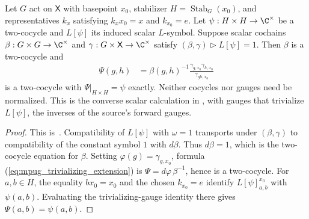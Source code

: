 \begin{lemma}
    \label{lem:mpug_trivializing_extension}
    \leanok
    Let $G$ act on $\mathsf X$ with basepoint $x_0$, stabilizer
    $H=\operatorname{Stab}_G(x_0)$, and representatives $k_x$ satisfying
    $k_xx_0=x$ and $k_{x_0}=e$. Let $\psi:H\times H\to\C^\times$ be a
    two-cocycle and $L[\psi]$ its induced scalar $L$-symbol.
    Suppose scalar cochains $\beta:G\times G\to\C^\times$ and
    $\gamma:G\times\mathsf X\to\C^\times$ satisfy
    $(\beta,\gamma)\mathbin{\triangleright}L[\psi]=1$.
    Then $\beta$ is a two-cocycle and
    \begin{align}
        \Psi(g,h)
         & =\beta(g,h)^{-1}
        \frac{\gamma_{g,x_0}\gamma_{h,x_0}}{\gamma_{gh,x_0}}
        \label{eq:mpug_trivializing_extension}
    \end{align}
    is a two-cocycle with $\Psi|_{H\times H}=\psi$ exactly.
    Neither cocycles nor gauges need be normalized.
    This is the converse scalar calculation in
    \cite[lines~7057--7064]{FrancoRubio2025MPUGauging}, with gauges that
    trivialize $L[\psi]$, the inverses of the source's forward gauges.
\end{lemma}

\begin{proof}\leanok
    This is~\cite[``Exact extension from trivializing scalar
        gauges'']{QICLean2026Blueprint}.
    Compatibility of $L[\psi]$ with $\omega=1$ transports under
    $(\beta,\gamma)$ to compatibility of the constant symbol $1$ with
    $d\beta$. Thus $d\beta=1$, which is the two-cocycle equation for
    $\beta$. Setting $\varphi(g)=\gamma_{g,x_0}$, formula
    (\ref{eq:mpug_trivializing_extension}) is
    $\Psi=d\varphi\,\beta^{-1}$, hence is a two-cocycle.
    For $a,b\in H$, the equality $bx_0=x_0$ and the chosen
    $k_{x_0}=e$ identify $L[\psi]^{x_0}_{a,b}$ with $\psi(a,b)$.
    Evaluating the trivializing-gauge identity there gives
    $\Psi(a,b)=\psi(a,b)$.
\end{proof}

